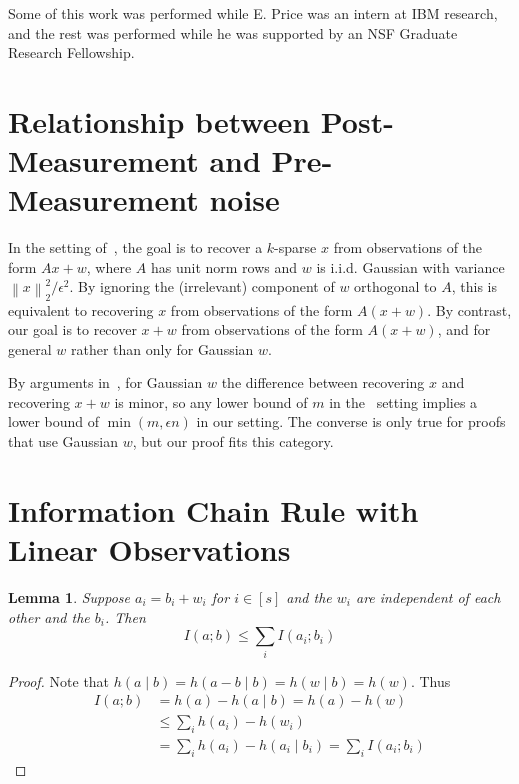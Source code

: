 \documentclass[twoside,leqno,twocolumn]{article}
\newtheorem{lemma}[theorem]{Lemma}
\newcommand{\norm}[2]{\left \lVert#2\right \rVert_{#1}}
\def\eps{\epsilon}
\begin{document}
Some of this work was performed while E. Price was an intern at IBM
research, and the rest was performed while he was supported by an NSF
Graduate Research Fellowship.

\newpage





\appendix

\section{Relationship between Post-Measurement and Pre-Measurement
  noise}\label{app:noisekind}


In the setting of~\cite{ACD11}, the goal is to recover a $k$-sparse
$x$ from observations of the form $Ax+w$, where $A$ has unit norm rows
and $w$ is i.i.d. Gaussian with variance $\norm{2}{x}^2/\eps^2$.  By
ignoring the (irrelevant) component of $w$ orthogonal to $A$, this is
equivalent to recovering $x$ from observations of the form $A(x+w)$.
By contrast, our goal is to recover $x+w$ from observations of the
form $A(x+w)$, and for general $w$ rather than only for Gaussian $w$.

By arguments in~\cite{PW11,HIKP12}, for Gaussian $w$ the difference
between recovering $x$ and recovering $x+w$ is minor, so any lower
bound of $m$ in the~\cite{ACD11} setting implies a lower bound of
$\min(m, \eps n)$ in our setting.  The converse is only true for
proofs that use Gaussian $w$, but our proof fits this category.

\section{Information Chain Rule with Linear Observations}

\begin{lemma}\label{lemma:splitentropy}
  Suppose $a_i = b_i + w_i$ for $i \in [s]$ and the $w_i$ are
  independent of each other and the $b_i$.  Then
  \[
  I(a; b) \leq \sum_i I(a_i; b_i)
  \]
\end{lemma}
\begin{proof}
  Note that $h(a\mid b) = h(a-b\mid b) = h(w \mid b) = h(w)$.  Thus
  \begin{align*}
    I(a; b) &= h(a) - h(a \mid b) = h(a) - h(w)\\
    &\leq \sum_i h(a_i) - h(w_i) \\
    &= \sum_i h(a_i) - h(a_i \mid b_i) = \sum_i I(a_i; b_i)
  \end{align*}
\end{proof}
\end{document}
